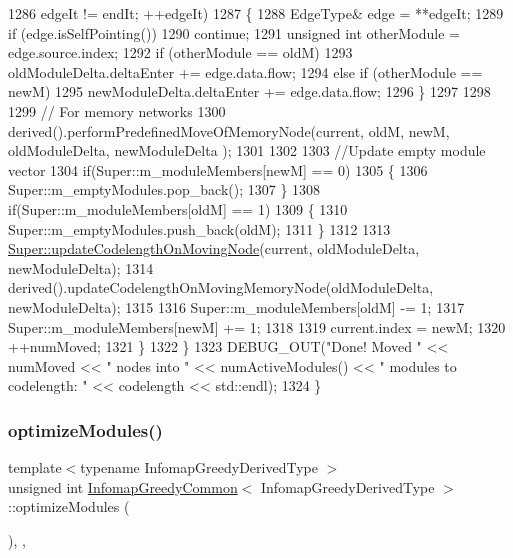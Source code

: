 \begin{DoxyCode}
1286                     edgeIt != endIt; ++edgeIt)
1287             \{
1288                 EdgeType& edge = **edgeIt;
1289                 \textcolor{keywordflow}{if} (edge.isSelfPointing())
1290                     \textcolor{keywordflow}{continue};
1291                 \textcolor{keywordtype}{unsigned} \textcolor{keywordtype}{int} otherModule = edge.source.index;
1292                 \textcolor{keywordflow}{if} (otherModule == oldM)
1293                     oldModuleDelta.deltaEnter += edge.data.flow;
1294                 \textcolor{keywordflow}{else} \textcolor{keywordflow}{if} (otherModule == newM)
1295                     newModuleDelta.deltaEnter += edge.data.flow;
1296             \}
1297 
1298 
1299             \textcolor{comment}{// For memory networks}
1300             derived().performPredefinedMoveOfMemoryNode(current, oldM, newM, oldModuleDelta, newModuleDelta
      );
1301 
1302 
1303             \textcolor{comment}{//Update empty module vector}
1304             \textcolor{keywordflow}{if}(Super::m\_moduleMembers[newM] == 0)
1305             \{
1306                 Super::m\_emptyModules.pop\_back();
1307             \}
1308             \textcolor{keywordflow}{if}(Super::m\_moduleMembers[oldM] == 1)
1309             \{
1310                 Super::m\_emptyModules.push\_back(oldM);
1311             \}
1312 
1313             \mbox{\hyperlink{classInfomapGreedySpecialized_a6f4ff75d89a26f1b474ca5a2190878c7}{Super::updateCodelengthOnMovingNode}}(current, oldModuleDelta,
       newModuleDelta);
1314             derived().updateCodelengthOnMovingMemoryNode(oldModuleDelta, newModuleDelta);
1315 
1316             Super::m\_moduleMembers[oldM] -= 1;
1317             Super::m\_moduleMembers[newM] += 1;
1318 
1319             current.index = newM;
1320             ++numMoved;
1321         \}
1322     \}
1323     DEBUG\_OUT(\textcolor{stringliteral}{"Done! Moved "} << numMoved << \textcolor{stringliteral}{" nodes into "} << numActiveModules() << \textcolor{stringliteral}{" modules to
       codelength: "} << codelength << std::endl);
1324 \}
\end{DoxyCode}
\mbox{\label{classInfomapGreedyCommon_a17feb30bfa3d448f7933c3fcc237f833}} 
\subsubsection{\texorpdfstring{optimize\+Modules()}{optimizeModules()}}
{\footnotesize\ttfamily template$<$typename Infomap\+Greedy\+Derived\+Type $>$ \\
unsigned int \mbox{\hyperlink{classInfomapGreedyCommon}{Infomap\+Greedy\+Common}}$<$ Infomap\+Greedy\+Derived\+Type $>$\+::optimize\+Modules (\begin{DoxyParamCaption}{ }\end{DoxyParamCaption})\hspace{0.3cm}{\ttfamily [inline]}, {\ttfamily [protected]}, {\ttfamily [virtual]}}

